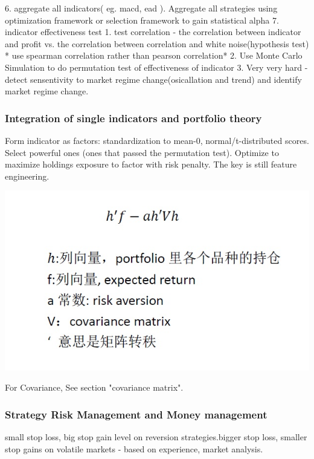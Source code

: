 \documentclass[11pt, openany]{book}              %
\begin{document}
6. aggregate all indicators( eg. macd, ead ). Aggregate all strategies using optimization framework or selection framework to gain statistical alpha
7. indicator effectiveness test
1. test correlation - the correlation between indicator and profit vs. the correlation between correlation and white noise(hypothesis test) * use spearman correlation rather than pearson correlation* 
2. Use Monte Carlo Simulation to do permutation test of effectiveness of indicator
3. Very very hard - detect sensentivity to market regime change(osicallation and trend) and identify market regime change. 

\subsubsection{Integration of single indicators and portfolio theory}

Form indicator as factors: standardization to mean-0, normal/t-distributed scores. Select powerful ones (ones that passed the permutation test). Optimize to maximize holdings exposure to factor with risk penalty. The key is still feature engineering.

\includegraphics[scale=0.5]{11.JPG}

For Covariance, See section "covariance matrix".  



\subsubsection{Strategy Risk Management and Money management}

small stop loss, big stop gain level on reversion strategies.bigger stop loss, smaller stop gains on volatile markets - based on experience, market analysis.
\end{document}

